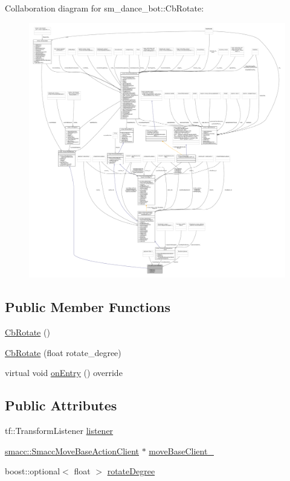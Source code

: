 Collaboration diagram for sm\+\_\+dance\+\_\+bot\+:\+:Cb\+Rotate\+:
\nopagebreak
\begin{figure}[H]
\begin{center}
\leavevmode
\includegraphics[width=350pt]{classsm__dance__bot_1_1CbRotate__coll__graph}
\end{center}
\end{figure}
\subsection*{Public Member Functions}
\begin{DoxyCompactItemize}
\item 
\hyperlink{classsm__dance__bot_1_1CbRotate_a56c0ab90797abc95aa5357fd404fa37c}{Cb\+Rotate} ()
\item 
\hyperlink{classsm__dance__bot_1_1CbRotate_ad05e2b97f956e8616b7bcfc0ebe1a160}{Cb\+Rotate} (float rotate\+\_\+degree)
\item 
virtual void \hyperlink{classsm__dance__bot_1_1CbRotate_ad4e05a82d567baea5e373b7eec187760}{on\+Entry} () override
\end{DoxyCompactItemize}
\subsection*{Public Attributes}
\begin{DoxyCompactItemize}
\item 
tf\+::\+Transform\+Listener \hyperlink{classsm__dance__bot_1_1CbRotate_a40f03a928591fed26f84a35be9ddc741}{listener}
\item 
\hyperlink{classsmacc_1_1SmaccMoveBaseActionClient}{smacc\+::\+Smacc\+Move\+Base\+Action\+Client} $\ast$ \hyperlink{classsm__dance__bot_1_1CbRotate_a9e4fe62d3ea7ee7c31fb9b328de263fd}{move\+Base\+Client\+\_\+}
\item 
boost\+::optional$<$ float $>$ \hyperlink{classsm__dance__bot_1_1CbRotate_aede47d27b6caff0d5459afd1762ddda2}{rotate\+Degree}
\end{DoxyCompactItemize}


